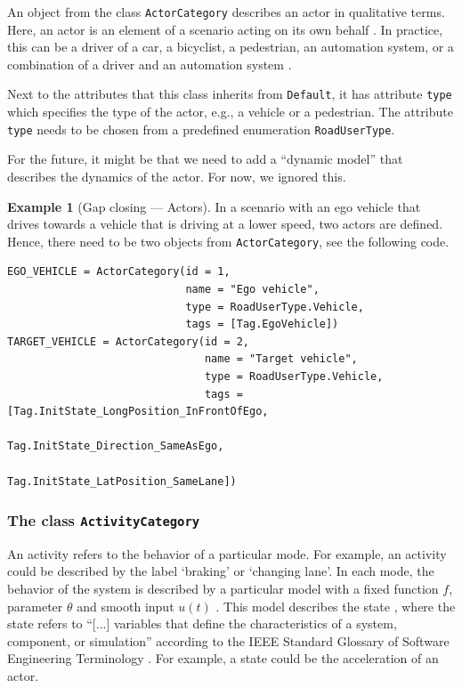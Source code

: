 \documentclass[10pt,final,a4paper,oneside,onecolumn]{article}
\theoremstyle{plain}\newtheorem{definition}{Definition}[section]    %
\theoremstyle{definition}\newtheorem{example}{Example}[section]     %
\theoremstyle{remark}\newtheorem{remarkenv}{Remark}[section]        %
\begin{document}
An object from the class \texttt{ActorCategory} describes an actor in qualitative terms. Here, an actor is an element of a scenario acting on its own behalf \cite{ulbrich2015}. In practice, this can be a driver of a car, a bicyclist, a pedestrian, an automation system, or a combination of a driver and an automation system \cite{geyer2014}. 

Next to the attributes that this class inherits from \texttt{Default}, it has attribute \texttt{type} which specifies the type of the actor, e.g., a vehicle or a pedestrian. The attribute \texttt{type} needs to be chosen from a predefined enumeration \texttt{RoadUserType}. 

For the future, it might be that we need to add a ``dynamic model'' that describes the dynamics of the actor. For now, we ignored this.

\begin{example}[Gap closing --- Actors] \label{example:actor category}
	In a scenario with an ego vehicle that drives towards a vehicle that is driving at a lower speed, two actors are defined. Hence, there need to be two objects from \texttt{ActorCategory}, see the following code.
	
	\begin{lstlisting}[caption=Code for instantiating two objects of \texttt{ActorCategory}.]
EGO_VEHICLE = ActorCategory(id = 1,
                            name = "Ego vehicle",
                            type = RoadUserType.Vehicle,
                            tags = [Tag.EgoVehicle])
TARGET_VEHICLE = ActorCategory(id = 2,
                               name = "Target vehicle",
                               type = RoadUserType.Vehicle,
                               tags = [Tag.InitState_LongPosition_InFrontOfEgo,
                                       Tag.InitState_Direction_SameAsEgo,
                                       Tag.InitState_LatPosition_SameLane])
	\end{lstlisting}
\end{example}

\subsubsection{The class \texttt{ActivityCategory}}
\label{sec:activity category}

An activity refers to the behavior of a particular mode. For example, an activity could be described by the label `braking' or `changing lane'. In each mode, the behavior of the system is described by a
particular model with a fixed function $f$, parameter $\theta$ and smooth input $u(t)$ \cite{deschutter2000optimal}. This model describes the state \cite{norman2011control}, where the state refers to ``[...] variables that define the characteristics of a system, component, or simulation'' according to the IEEE Standard Glossary of Software Engineering Terminology \cite{ieee1990glossary}. For example, a state could be the acceleration of an actor.
\end{document}
